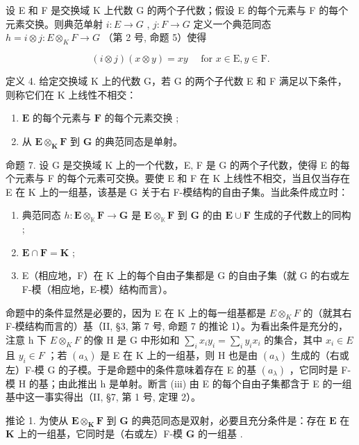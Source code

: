 设 E 和 F 是交换域 K 上代数 G 的两个子代数；假设 E 的每个元素与 F 的每个元素交换。则典范单射 \(i: E \to G\) , \(j: F \to G\) 定义一个典范同态 \(h = i \otimes j: E \otimes_{K} F \to G\) （第 2 号, 命题 5）使得

\[
(i \otimes j) (x \otimes y) = x y \quad \text { for } x \in \mathrm{E}, y \in \mathrm{F}.
\]

定义 4. 给定交换域 K 上的代数 G，若 G 的两个子代数 E 和 F 满足以下条件，则称它们在 K 上线性不相交：

\begin{enumerate}
\def\labelenumi{(\arabic{enumi})}
\item
  \(\mathbf{E}\) 的每个元素与 \(\mathbf{F}\) 的每个元素交换 ;
\item
  从 \(\mathbf{E} \otimes_{\mathbf{K}} \mathbf{F}\) 到 \(\mathbf{G}\) 的典范同态是单射。
\end{enumerate}

命题 7. 设 G 是交换域 K 上的一个代数，E, F 是 G 的两个子代数，使得 E 的每个元素与 F 的每个元素可交换。要使 E 和 F 在 K 上线性不相交，当且仅当存在 E 在 K 上的一组基，该基是 G 关于右 F-模结构的自由子集。当此条件成立时：

\begin{enumerate}
\def\labelenumi{(\roman{enumi})}
\item
  典范同态 \(h: \mathbf{E} \otimes_{\mathbb{K}} \mathbf{F} \to \mathbf{G}\) 是 \(\mathbf{E} \otimes_{\mathbb{K}} \mathbf{F}\) 到 \(\mathbf{G}\) 的由 \(\mathbf{E} \cup \mathbf{F}\) 生成的子代数上的同构 ;
\item
  \(\mathbf{E} \cap \mathbf{F} = \mathbf{K}\) ;
\item
  E（相应地，F）在 K 上的每个自由子集都是 G 的自由子集（就 G 的右或左 F-模（相应地，E-模）结构而言）。
\end{enumerate}

命题中的条件显然是必要的，因为 E 在 K 上的每一组基都是 \(E \otimes_{K} F\) 的（就其右 F-模结构而言的）基（II, §3, 第 7 号, 命题 7 的推论 1）。为看出条件是充分的，注意 h 下 \(E \otimes_{K} F\) 的像 H 是 G 中形如和 \(\sum_{i} x_{i} y_{i} = \sum_{i} y_{i} x_{i}\) 的集合，其中 \(x_{i} \in E\) 且 \(y_{i} \in F\) ；若 \((a_{\lambda})\) 是 E 在 K 上的一组基，则 H 也是由 \((a_{\lambda})\) 生成的（右或左）F-模 G 的子模。于是命题中的条件意味着存在 E 的基 \((a_{\lambda})\) ，它同时是 F-模 H 的基；由此推出 h 是单射。断言 (iii) 由 E 的每个自由子集都含于 E 的一组基中这一事实得出（II, §7, 第 1 号, 定理 2）。

推论 1. 为使从 \(\mathbf{E} \otimes_{\mathbf{K}} \mathbf{F}\) 到 \(\mathbf{G}\) 的典范同态是双射，必要且充分条件是：存在 \(\mathbf{E}\) 在 \(\mathbf{K}\) 上的一组基，它同时是（右或左）F-模 \(\mathbf{G}\) 的一组基 .

